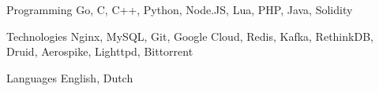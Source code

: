 

\begin{cvskills}

  \cvskill
    {Programming} %
    {Go, C, C++, Python, Node.JS, Lua, PHP, Java, Solidity} %

  \cvskill
    {Technologies}
		{Nginx, MySQL, Git, Google Cloud, Redis, Kafka, RethinkDB, Druid, Aerospike, Lighttpd, Bittorrent}

  \cvskill
    {Languages} %
    {English, Dutch} %

\end{cvskills}
